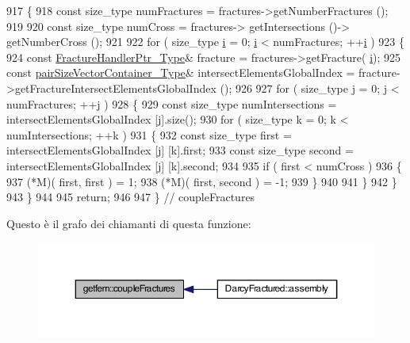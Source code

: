 \begin{DoxyCode}
917 \{
918     \textcolor{keyword}{const} size\_type numFractures = fractures->getNumberFractures ();
919     
920     \textcolor{keyword}{const} size\_type numCross = fractures-> getIntersections ()-> getNumberCross ();
921     
922     \textcolor{keywordflow}{for} ( size\_type \hyperlink{matrici_8m_a6f6ccfcf58b31cb6412107d9d5281426}{i} = 0; \hyperlink{matrici_8m_a6f6ccfcf58b31cb6412107d9d5281426}{i} < numFractures; ++\hyperlink{matrici_8m_a6f6ccfcf58b31cb6412107d9d5281426}{i} )
923     \{
924         \textcolor{keyword}{const} \hyperlink{FractureHandler_8h_af23fb7a30aaff864bd42587af4f1e78a}{FractureHandlerPtr\_Type}& fracture = fractures->getFracture(
      \hyperlink{matrici_8m_a6f6ccfcf58b31cb6412107d9d5281426}{i});
925         \textcolor{keyword}{const} \hyperlink{Core_8h_a9bc476e433f99b82a9c2b8560735c7b5}{pairSizeVectorContainer\_Type}& intersectElementsGlobalIndex = 
      fracture->getFractureIntersectElementsGlobalIndex ();
926 
927         \textcolor{keywordflow}{for} ( size\_type j = 0; j < numFractures; ++j )
928         \{
929             \textcolor{keyword}{const} size\_type numIntersections = intersectElementsGlobalIndex [j].size();
930             \textcolor{keywordflow}{for} ( size\_type k = 0; k < numIntersections; ++k )
931             \{
932                 \textcolor{keyword}{const} size\_type first = intersectElementsGlobalIndex [j] [k].first;
933                 \textcolor{keyword}{const} size\_type second = intersectElementsGlobalIndex [j] [k].second;
934                 
935                 \textcolor{keywordflow}{if} ( first < numCross )
936                 \{
937                     (*M)( first, first ) = 1;
938                     (*M)( first, second ) = -1;
939                 \}
940                
941             \}
942         \}
943     \}
944     
945     \textcolor{keywordflow}{return};
946 
947 \} \textcolor{comment}{// coupleFractures}
\end{DoxyCode}


Questo è il grafo dei chiamanti di questa funzione\-:\nopagebreak
\begin{figure}[H]
\begin{center}
\leavevmode
\includegraphics[width=350pt]{namespacegetfem_a9a0b9f7498668cda8b547b10ac914a34_icgraph}
\end{center}
\end{figure}


